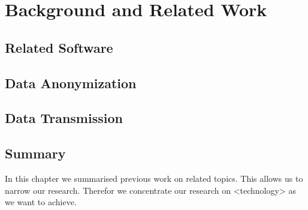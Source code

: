 \chapter{Background and Related Work}
\label{chap:related_work}


\section{Related Software}
\label{sec:related_work:related_sw}
%


\section{Data Anonymization}
\label{sec:related_work:data_aononymization}
%

\section{Data Transmission}
\label{sec:related_work:data_transmission}
%

\section{Summary}
In this chapter we summarised previous work on related topics. This allows us to narrow our research.
Therefor we concentrate our research on <technology> as we want to achieve.
%


